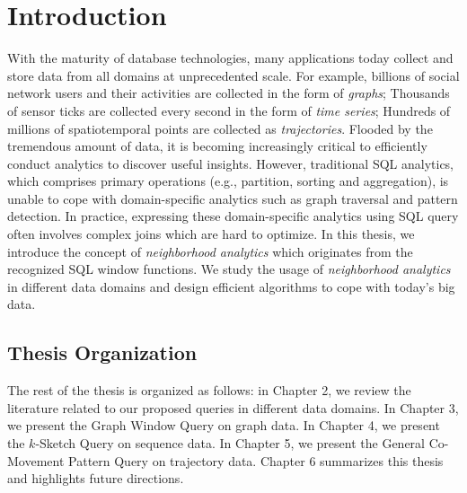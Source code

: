 \chapter{Introduction}
With the maturity of database technologies, many applications today collect and store data from all domains 
at unprecedented scale. For example, billions of 
social network users and their activities are collected in the form
of \emph{graphs}; Thousands of sensor ticks are collected every second
in the form of \emph{time series}; Hundreds of millions of spatiotemporal points
are collected as \emph{trajectories}.
Flooded by the tremendous amount of data, 
it is becoming increasingly critical to efficiently
conduct analytics to discover useful insights.
However, traditional SQL analytics, which comprises 
primary operations (e.g., partition, sorting and aggregation),
is unable to cope  with domain-specific analytics 
such as graph traversal and pattern detection. 
In practice, expressing these domain-specific 
analytics using SQL query often involves 
complex joins which are hard to optimize. 
In this thesis, we introduce the concept of \emph{neighborhood analytics} which
originates from the recognized SQL window functions. We study
the usage of \emph{neighborhood analytics} in different data domains
and design efficient algorithms to cope with today's big data.

%




 


\section{Thesis Organization}
The rest of the thesis is organized as follows: in Chapter 2, we review the literature related
to our proposed queries in different data domains.
In Chapter 3, we present the Graph Window Query on graph data. 
In Chapter 4, we present the $k$-Sketch Query on sequence data.
In Chapter 5, we present the General Co-Movement Pattern Query on trajectory data. 
Chapter 6 summarizes this thesis and highlights future directions.

